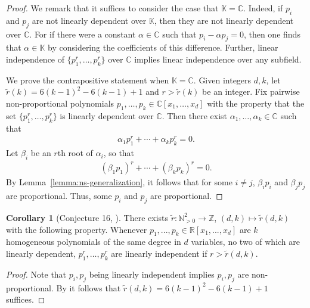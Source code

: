 \documentclass[12pt]{article}
\theoremstyle{definition}
\newtheorem{corollary}[theorem]{Corollary}
\newcommand{\upperboundn}[1]{6{#1}^2-6#1+1}
\newcommand{\kNS}{k}
\begin{document}
\begin{proof}
    We remark that it suffices to consider the case that $\mathbb{K} = \mathbb{C}$. Indeed, if $p_i$ and $p_j$ are not linearly dependent over $\mathbb{K}$, then they are not linearly dependent over $\mathbb{C}$. For if there were a constant $\alpha\in\mathbb{C}$ such that $p_i - \alpha p_j = 0$, then one finds that $\alpha\in\mathbb{K}$ by considering the coefficients of this difference. Further, linear independence of $\{p_1^r,\dotsc,p_k^r\}$ over $\mathbb{C}$ implies linear independence over any subfield. 
    
    We prove the contrapositive statement when $\mathbb{K} = \mathbb{C}$. Given integers $d,k$, let
    $\tilde{r}(k) = \upperboundn{(k-1)}$ and $r>\tilde{r}(k)$ be an integer. Fix pairwise non-proportional polynomials $p_1,\dotsc,p_k\in\mathbb{C}[x_1,\dotsc,x_d]$ with the property that the set $\{p_1^r,\dotsc,p_k^r\}$ is linearly dependent over $\mathbb{C}$. Then there exist $\alpha_1,\dots,\alpha_k\in \mathbb{C}$ such that 
    \begin{align*}
    \alpha_1p_1^r+\cdots +\alpha_k p_k^r=0.
    \end{align*}
    Let $\beta_i$ be an $r$th root of $\alpha_i$, so that
    \begin{align*} 
    (\beta_1p_1)^r+\cdots +(\beta_k p_k)^r=0.
    \end{align*}
    By Lemma~\ref{lemma:ns-generalization}, it follows that for some $i\ne j$, $\beta_i p_i$ and $\beta_j p_j$ are proportional. Thus, some $p_i$ and $p_j$ are proportional.    
\end{proof}


\begin{corollary}[Conjecture 16, \cite{KTB2019}]\label{corollary:universal-bound}
There exists $\tilde r:\mathbb{N}^2_{>0}\to\mathbb{Z}$, $(d,k)\mapsto\tilde r(d,k)$ with the following property. Whenever $p_1,...,p_k\in \mathbb{R}[x_1,...,x_d]$ are $k$ homogeneous polynomials of the same degree in $d$ variables, no two of which are linearly dependent, $p^r_1,\dots , p^r_k$ are linearly independent if $r>\tilde r({d,k})$.     
\end{corollary}
\begin{proof}
Note that $p_i,p_j$ being linearly independent implies $p_i,p_j$ are  non-proportional. 
    By  it follows that  
    $\tilde r(d,k)=\upperboundn{(\kNS-1)}$
    suffices. 
\end{proof}
\end{document}
